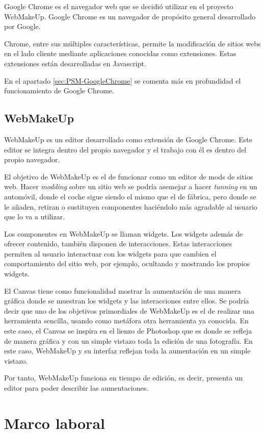 Google Chrome es el navegador web que se decidió utilizar en el proyecto WebMakeUp. Google Chrome es un navegador de propósito general desarrollado por Google.

Chrome, entre sus múltiples características, permite la modificación de sitios webs en el lado cliente mediante aplicaciones conocidas como extensiones. Estas extensiones están desarrolladas en Javascript.

En el apartado \ref{sec:PSM-GoogleChrome} se comenta más en profundidad el funcionamiento de Google Chrome.

\subsection{WebMakeUp}

WebMakeUp es un editor desarrollado como extensión de Google Chrome. Este editor se integra dentro del propio navegador y el trabajo con él es dentro del propio navegador.

El objetivo de WebMakeUp es el de funcionar como un editor de mods de sitios web. Hacer \emph{modding} sobre un sitio web se podría asemejar a hacer \emph{tunning} en un automóvil, donde el coche sigue siendo el mismo que el de fábrica, pero donde se le añaden, retiran o sustituyen componentes haciéndolo más agradable al usuario que lo va a utilizar.

Los componentes en WebMakeUp se llaman widgets. Los widgets además de ofrecer contenido, también disponen de interacciones. Estas interacciones permiten al usuario interactuar con los widgets para que cambien el comportamiento del sitio web, por ejemplo, ocultando y mostrando los propios widgets.

El Canvas tiene como funcionalidad mostrar la aumentación de una manera gráfica donde se muestran los widgets y las interacciones entre ellos. Se podría decir que uno de los objetivos primordiales de WebMakeUp es el de realizar una herramienta sencilla, usando como metáfora otra herramienta ya conocida. En este caso, el Canvas se inspira en el lienzo de Photoshop que es donde se refleja de manera gráfica y con un simple vistazo toda la edición de una fotografía. En este caso, WebMakeUp y su interfaz reflejan toda la aumentación en un simple vistazo.

Por tanto, WebMakeUp funciona en tiempo de edición, es decir, presenta un editor para poder describir las aumentaciones.

\section{Marco laboral}

